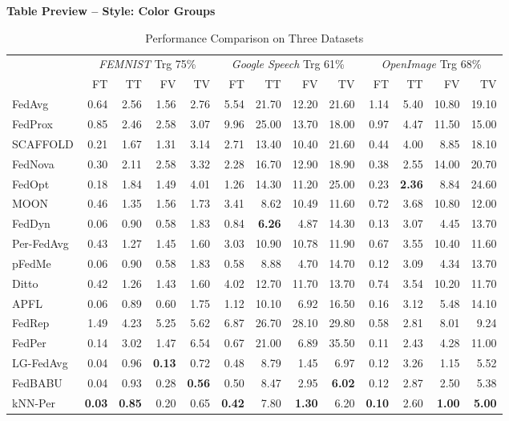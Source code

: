 \documentclass[conference]{IEEEtran}
\begin{document}
\onecolumn
\begin{center}
\Large\textbf{Table Preview -- Style: Color Groups}
\end{center}
\vspace{1em}
\begin{table}[t]
\centering
\caption{Performance Comparison on Three Datasets}
\label{tab:main-result}
\footnotesize

\begin{tabular}{l|rrrr|rrrr|rrrr|}
\toprule
 & \multicolumn{4}{c}{\textit{FEMNIST} Trg 75\%} & \multicolumn{4}{c}{\textit{Google Speech} Trg 61\%} & \multicolumn{4}{c}{\textit{OpenImage} Trg 68\%} \\
\cmidrule(lr){2-5} \cmidrule(lr){6-9} \cmidrule(lr){10-13}
 & FT & TT & FV & TV & FT & TT & FV & TV & FT & TT & FV & TV \\
\cmidrule(lr){2-5} \cmidrule(lr){6-9} \cmidrule(lr){10-13}
FedAvg & 0.64 & 2.56 & 1.56 & 2.76 & 5.54 & 21.70 & 12.20 & 21.60 & 1.14 & 5.40 & 10.80 & 19.10 \\
FedProx & 0.85 & 2.46 & 2.58 & 3.07 & 9.96 & 25.00 & 13.70 & 18.00 & 0.97 & 4.47 & 11.50 & 15.00 \\
SCAFFOLD & 0.21 & 1.67 & 1.31 & 3.14 & 2.71 & 13.40 & 10.40 & 21.60 & 0.44 & 4.00 & 8.85 & 18.10 \\
FedNova & 0.30 & 2.11 & 2.58 & 3.32 & 2.28 & 16.70 & 12.90 & 18.90 & 0.38 & 2.55 & 14.00 & 20.70 \\
FedOpt & 0.18 & 1.84 & 1.49 & 4.01 & 1.26 & 14.30 & 11.20 & 25.00 & 0.23 & \textbf{2.36} & 8.84 & 24.60 \\
MOON & 0.46 & 1.35 & 1.56 & 1.73 & 3.41 & 8.62 & 10.49 & 11.60 & 0.72 & 3.68 & 10.80 & 12.00 \\
FedDyn & 0.06 & 0.90 & 0.58 & 1.83 & 0.84 & \textbf{6.26} & 4.87 & 14.30 & 0.13 & 3.07 & 4.45 & 13.70 \\
Per-FedAvg & 0.43 & 1.27 & 1.45 & 1.60 & 3.03 & 10.90 & 10.78 & 11.90 & 0.67 & 3.55 & 10.40 & 11.60 \\
pFedMe & 0.06 & 0.90 & 0.58 & 1.83 & 0.58 & 8.88 & 4.70 & 14.70 & 0.12 & 3.09 & 4.34 & 13.70 \\
Ditto & 0.42 & 1.26 & 1.43 & 1.60 & 4.02 & 12.70 & 11.70 & 13.70 & 0.74 & 3.54 & 10.20 & 11.70 \\
APFL & 0.06 & 0.89 & 0.60 & 1.75 & 1.12 & 10.10 & 6.92 & 16.50 & 0.16 & 3.12 & 5.48 & 14.10 \\
FedRep & 1.49 & 4.23 & 5.25 & 5.62 & 6.87 & 26.70 & 28.10 & 29.80 & 0.58 & 2.81 & 8.01 & 9.24 \\
FedPer & 0.14 & 3.02 & 1.47 & 6.54 & 0.67 & 21.00 & 6.89 & 35.50 & 0.11 & 2.43 & 4.28 & 11.00 \\
LG-FedAvg & 0.04 & 0.96 & \textbf{0.13} & 0.72 & 0.48 & 8.79 & 1.45 & 6.97 & 0.12 & 3.26 & 1.15 & 5.52 \\
FedBABU & 0.04 & 0.93 & 0.28 & \textbf{0.56} & 0.50 & 8.47 & 2.95 & \textbf{6.02} & 0.12 & 2.87 & 2.50 & 5.38 \\
kNN-Per & \textbf{0.03} & \textbf{0.85} & 0.20 & 0.65 & \textbf{0.42} & 7.80 & \textbf{1.30} & 6.20 & \textbf{0.10} & 2.60 & \textbf{1.00} & \textbf{5.00} \\
\bottomrule
\end{tabular}
\end{table}
\end{document}
